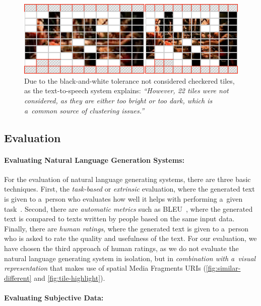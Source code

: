 \begin{figure}[!ht]
  \centering
  \includegraphics[width=0.75\linewidth]{./tile-highlight.png}
  \caption[Due to the black-and-white tolerance not considered checkered tiles]{Due to the black-and-white tolerance not considered checkered tiles, as the text-to-speech system explains: \textit{``However, 22 tiles were not considered, as they are either too bright or too dark, which is a~common source of clustering issues.''}}
  \label{fig:tile-highlight}
\end{figure}

\subsection{Evaluation}
\label{sec:evaluation}

\paragraph{Evaluating Natural Language Generation Systems:}

For the evaluation of natural language generating systems,
there are three basic techniques.
First, the \emph{task-based} or \emph{extrinsic} evaluation,
where the generated text is given to a~person who evaluates
how well it helps with performing a~given task~\cite{portet2009nlg}.
Second, there are \emph{automatic metrics}
such as BLEU~\cite{papineni2002bleu}, where the generated text
is compared to texts written by people based on the same input data.
Finally, there are \emph{human ratings}, where the generated text
is given to a~person who is asked to rate the quality and usefulness of the text.
For our evaluation, we have chosen the third approach of human ratings,
as we do not evaluate the natural language generating system in isolation,
but in \emph{combination with a~visual representation}
that makes use of spatial Media Fragments URIs
(\autoref{fig:similar-different} and \autoref{fig:tile-highlight}).

\paragraph{Evaluating Subjective Data:}

